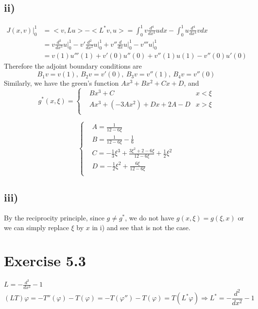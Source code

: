 \documentclass[a4paper, 11pt]{article}
\begin{document}
\begin{spacing}{1.5}
\subsection*{ii)}
\begin{align*}
J(x,v)\Big|_0^1 & = <v,Lu> - <L^*v,u> = \int_{0}^{1} v \frac{d^4}{dx^4} udx - \int_{0}^{1} u\frac{d^4}{dx^4} v dx \\
& = v\frac{d^3}{dx^3} u \Big|_0^1 - v' \frac{d^2}{dx^2} u \Big|_0^1 + v''\frac{d}{dx} u \Big|_0^1 - v'''u\Big|_0^1 \\
& = v(1)u'''(1) + v'(0) u''(0) + v''(1)u(1) - v''(0)u'(0)
\end{align*}
Therefore the adjoint boundary conditions are 
$$
    B_1v = v(1), \ B_2v = v'(0) , \ B_3v = v''(1) , \ B_4v = v''(0)
$$
Similarly, we have the green's function $Ax^3+Bx^2+Cx+D$, and 
$$
    g^*(x,\xi) = \left\{
    \begin{aligned}
    & Bx^3 +C   &x<\xi\\
    & Ax^3 + (-3Ax^2) +Dx +2A - D &x>\xi\\
    \end{aligned}
    \right.
$$

$$
\left\{
\begin{aligned}
& A = \frac{1}{12-6\xi}  \\
& B = \frac{1}{12-6\xi} - \frac{1}{6} \\
& C = -\frac{1}{3} \xi^3 + \frac{3\xi^2+2-6\xi}{12-6\xi} + \frac{1}{2}\xi^2 \\
& D = -\frac{1}{2} \xi^2 + \frac{6\xi}{12-6\xi} \\
\end{aligned}
\right.
$$

\subsection*{iii)}
By the reciprocity principle, since $g \neq g^*$, we do not have $g(x,\xi) = g(\xi,x) $ or we can simply replace $\xi$ by $x$ in i) and see that is not the case.

\section*{Exercise 5.3}
$L = -\frac{d^3}{dx^3} -1$
$$
    (LT)\varphi = -T''(\varphi) - T(\varphi) = - T(\varphi'') - T(\varphi) = T(L^*\varphi) \Rightarrow L^* = -\frac{d^2}{dx^2} -1 
$$


\end{spacing}
\end{document}
